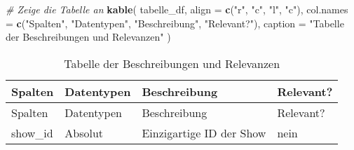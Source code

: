 \documentclass[
]{article}
\newenvironment{Shaded}{\begin{snugshade}}{\end{snugshade}}
\newcommand{\AttributeTok}[1]{\textcolor[rgb]{0.13,0.29,0.53}{#1}}
\newcommand{\CommentTok}[1]{\textcolor[rgb]{0.56,0.35,0.01}{\textit{#1}}}
\newcommand{\FunctionTok}[1]{\textcolor[rgb]{0.13,0.29,0.53}{\textbf{#1}}}
\newcommand{\NormalTok}[1]{#1}
\newcommand{\StringTok}[1]{\textcolor[rgb]{0.31,0.60,0.02}{#1}}
\begin{document}
\begin{Shaded}
\begin{Highlighting}[]
\CommentTok{\# Zeige die Tabelle an}
\FunctionTok{kable}\NormalTok{(}
\NormalTok{  tabelle\_df,}
  \AttributeTok{align =} \FunctionTok{c}\NormalTok{(}\StringTok{"r"}\NormalTok{, }\StringTok{"c"}\NormalTok{, }\StringTok{"l"}\NormalTok{, }\StringTok{"c"}\NormalTok{),}
  \AttributeTok{col.names =} \FunctionTok{c}\NormalTok{(}\StringTok{"Spalten"}\NormalTok{, }\StringTok{"Datentypen"}\NormalTok{, }\StringTok{"Beschreibung"}\NormalTok{, }\StringTok{"Relevant?"}\NormalTok{),}
  \AttributeTok{caption =} \StringTok{"Tabelle der Beschreibungen und Relevanzen"}
\NormalTok{)}
\end{Highlighting}
\end{Shaded}

\begin{longtable}[]{@{}
  >{\raggedleft\arraybackslash}p{}
  >{\centering\arraybackslash}p{}
  >{\raggedright\arraybackslash}p{}
  >{\centering\arraybackslash}p{}@{}}
\caption{Tabelle der Beschreibungen und Relevanzen}\tabularnewline
\toprule\noalign{}
\begin{minipage}[b]{\linewidth}\raggedleft
Spalten
\end{minipage} & \begin{minipage}[b]{\linewidth}\centering
Datentypen
\end{minipage} & \begin{minipage}[b]{\linewidth}\raggedright
Beschreibung
\end{minipage} & \begin{minipage}[b]{\linewidth}\centering
Relevant?
\end{minipage} \\
\midrule\noalign{}
\endfirsthead
\toprule\noalign{}
\begin{minipage}[b]{\linewidth}\raggedleft
Spalten
\end{minipage} & \begin{minipage}[b]{\linewidth}\centering
Datentypen
\end{minipage} & \begin{minipage}[b]{\linewidth}\raggedright
Beschreibung
\end{minipage} & \begin{minipage}[b]{\linewidth}\centering
Relevant?
\end{minipage} \\
\midrule\noalign{}
\endhead
\bottomrule\noalign{}
\endlastfoot
show\_id & Absolut & Einzigartige ID der Show & nein \\

\end{longtable}
\end{document}
